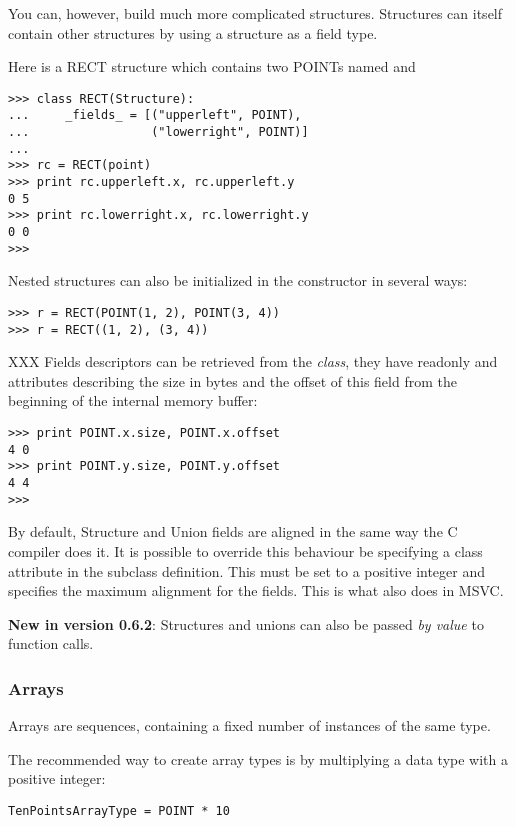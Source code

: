 You can, however, build much more complicated structures. Structures
can itself contain other structures by using a structure as a field
type.

Here is a RECT structure which contains two POINTs named 
and 
\begin{verbatim}
>>> class RECT(Structure):
...     _fields_ = [("upperleft", POINT),
...                 ("lowerright", POINT)]
...
>>> rc = RECT(point)
>>> print rc.upperleft.x, rc.upperleft.y
0 5
>>> print rc.lowerright.x, rc.lowerright.y
0 0
>>>
\end{verbatim}

Nested structures can also be initialized in the constructor in
several ways:
\begin{verbatim}
>>> r = RECT(POINT(1, 2), POINT(3, 4))
>>> r = RECT((1, 2), (3, 4))
\end{verbatim}

XXX Fields descriptors can be retrieved from the \emph{class}, they
have readonly  and  attributes describing the size
in bytes and the offset of this field from the beginning of the
internal memory buffer:
\begin{verbatim}
>>> print POINT.x.size, POINT.x.offset
4 0
>>> print POINT.y.size, POINT.y.offset
4 4
>>>
\end{verbatim}

By default, Structure and Union fields are aligned in the same way the
C compiler does it. It is possible to override this behaviour be
specifying a  class attribute in the subclass
definition. This must be set to a positive integer and specifies the
maximum alignment for the fields. This is what 
also does in MSVC.

\textbf{New in version 0.6.2}: Structures and unions can also be passed \emph{by
value} to function calls.


\subsubsection{Arrays\label{ctypes-arrays}}

Arrays are sequences, containing a fixed number of instances of the
same type.

The recommended way to create array types is by multiplying a data
type with a positive integer:
\begin{verbatim}
TenPointsArrayType = POINT * 10
\end{verbatim}

